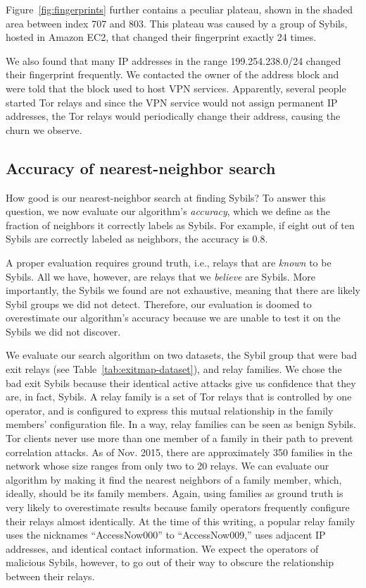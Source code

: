 Figure~\ref{fig:fingerprints} further contains a peculiar plateau, shown in the
shaded area between index 707 and 803.  This plateau was caused by a group of
Sybils, hosted in Amazon EC2, that changed their fingerprint exactly 24 times.

We also found that many IP addresses in the range 199.254.238.0/24 changed their
fingerprint frequently.  We contacted the owner of the address block and were
told that the block used to host VPN services.  Apparently, several people
started Tor relays and since the VPN service would not assign permanent IP
addresses, the Tor relays would periodically change their address, causing the
churn we observe.

\subsection{Accuracy of nearest-neighbor search}
\label{sec:accuracy}
How good is our nearest-neighbor search at finding Sybils?  To answer this
question, we now evaluate our algorithm's \emph{accuracy}, which we define as
the fraction of neighbors it correctly labels as Sybils.  For example, if eight
out of ten Sybils are correctly labeled as neighbors, the accuracy is 0.8.

A proper evaluation requires ground truth, i.e., relays that are \emph{known} to
be Sybils.  All we have, however, are relays that we \emph{believe} are Sybils.
More importantly, the Sybils we found are not exhaustive, meaning that there are
likely Sybil groups we did not detect.  Therefore, our evaluation is doomed to
overestimate our algorithm's accuracy because we are unable to test it on the
Sybils we did not discover.

We evaluate our search algorithm on two datasets, the Sybil group that were
bad exit relays (see Table~\ref{tab:exitmap-dataset}), and relay families.  We
chose the bad exit Sybils because their identical active attacks give us
confidence that they are, in fact, Sybils.  A relay family is a set of Tor
relays that is controlled by one operator, and is configured to express this
mutual relationship in the family members' configuration file.  In a way, relay
families can be seen as benign Sybils.  Tor clients never use more than one
member of a family in their path to prevent correlation attacks.  As of Nov.
2015, there are approximately 350 families in the network whose size ranges from
only two to 20 relays.  We can evaluate our algorithm by making it find the
nearest neighbors of a family member, which, ideally, should be its family
members.  Again, using families as ground truth is very likely to overestimate
results because family operators frequently configure their relays almost
identically.  At the time of this writing, a popular relay family uses the
nicknames ``AccessNow000'' to ``AccessNow009,'' uses adjacent IP addresses, and
identical contact information.  We expect the operators of malicious Sybils,
however, to go out of their way to obscure the relationship between their
relays.

